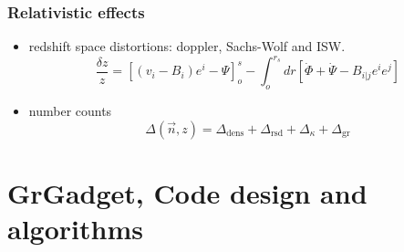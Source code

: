 \documentclass{beamer}
\makeatletter
\newcommand{\mylabel}{%
}
\makeatother
\begin{document}
\begin{frame}[label=greffects]
    \frametitle{Relativistic effects\mylabel}
    \begin{itemize}
        \item redshift space distortions: doppler, Sachs-Wolf and ISW.
        \[
            \frac{\delta z}{z}
            =  [ (v_i - B_i) e^i - \Psi ]^s_{o} - \int_o^{r_s} dr
            [\dot\Phi+\dot\Psi -
            B_{i|j} e^i e^j]
        \]
        \item number counts
        \[
            \Delta (\vec n, z) = 
            \Delta_{\mathrm{dens}}
            + \Delta_{\mathrm{rsd}}  %
            + \Delta_{\kappa}        %
            + \Delta_{\mathrm{gr}}   %
        \]
    \end{itemize}
\end{frame}


\section{GrGadget, Code design and algorithms}
\frame{\sectionpage}
\end{document}
